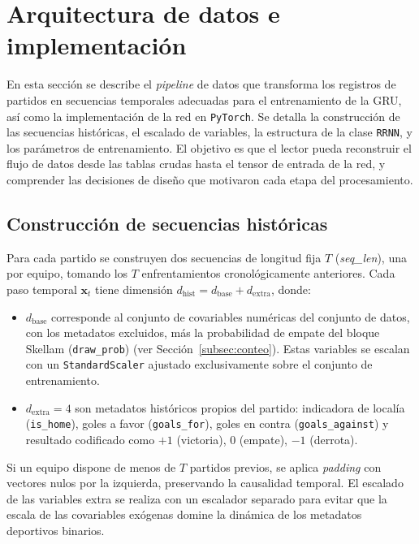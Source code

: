 
\section{Arquitectura de datos e implementaci\'on}
\label{sec:app_gru_arquitectura}

En esta secci\'on se describe el \textit{pipeline} de datos que transforma los registros de partidos en secuencias temporales adecuadas para el entrenamiento de la GRU, as\'i como la implementaci\'on de la red en \texttt{PyTorch}. Se detalla la construcci\'on de las secuencias hist\'oricas, el escalado de variables, la estructura de la clase \texttt{RRNN}, y los par\'ametros de entrenamiento. El objetivo es que el lector pueda reconstruir el flujo de datos desde las tablas crudas hasta el tensor de entrada de la red, y comprender las decisiones de dise\~no que motivaron cada etapa del procesamiento.

\subsection{Construcci\'on de secuencias hist\'oricas}
\label{subsec:app_gru_secuencias}

Para cada partido se construyen dos secuencias de longitud fija $T$ (\emph{seq\_len}), una por equipo, tomando los $T$ enfrentamientos cronol\'ogicamente anteriores. Cada paso temporal $\mathbf{x}_t$ tiene dimensi\'on $d_{\mathrm{hist}} = d_{\mathrm{base}} + d_{\mathrm{extra}}$, donde:
\begin{itemize}
	\item $d_{\mathrm{base}}$ corresponde al conjunto de covariables num\'ericas del conjunto de datos, con los metadatos excluidos, m\'as la probabilidad de empate del bloque Skellam (\texttt{draw\_prob}) (ver Secci\'on~\ref{subsec:conteo}). Estas variables se escalan con un \texttt{StandardScaler} ajustado exclusivamente sobre el conjunto de entrenamiento.
	\item $d_{\mathrm{extra}} = 4$ son metadatos hist\'oricos propios del partido: indicadora de local\'ia (\texttt{is\_home}), goles a favor (\texttt{goals\_for}), goles en contra (\texttt{goals\_against}) y resultado codificado como $+1$ (victoria), $0$ (empate), $-1$ (derrota).
\end{itemize}

Si un equipo dispone de menos de $T$ partidos previos, se aplica \textit{padding} con vectores nulos por la izquierda, preservando la causalidad temporal. El escalado de las variables extra se realiza con un escalador separado para evitar que la escala de las covariables ex\'ogenas domine la din\'amica de los metadatos deportivos binarios.

